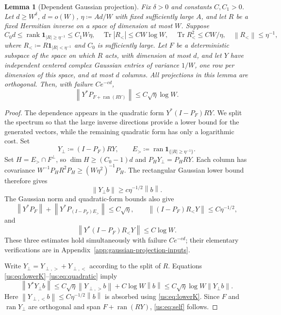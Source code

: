 \documentclass[11pt]{article}
\numberwithin{equation}{section}
\newtheorem{lemma}[theorem]{Lemma}
\theoremstyle{remark}
\newcommand{\Tr}{\operatorname{Tr}}
\newcommand{\rank}{\operatorname{rank}}
\newcommand{\ran}{\operatorname{ran}}
\newcommand{\one}{\mathbf 1}
\newcommand{\norm}[1]{\left\|#1\right\|}
\begin{document}
\begin{lemma}[Dependent Gaussian projection]\label{us:lem:self}
Fix $\delta>0$ and constants $C,C_1>0$. Let $d\ge W^\delta$, $d=o(W)$, $\eta\coloneqq Ad/W$ with fixed sufficiently
large $A$, and let $R$ be a fixed Hermitian inverse on a space of dimension
at most $W$. Suppose
\begin{equation}
 C_0d\le\rank\one_{|R|\ge\eta^{-1}}\le C_1W\eta,\quad
 \Tr|R_<|\le CW\log W,\quad
 \Tr R_<^2\le CW/\eta,\quad \norm{R_<}\le\eta^{-1},
 \label{us:eq:spectrum}
\end{equation}
where $R_<\coloneqq R\one_{|R|<\eta^{-1}}$ and $C_0$ is sufficiently large.
Let $F$ be a deterministic subspace of the space on which $R$ acts,
with dimension at most $d$, and let $Y$ have independent centered complex
Gaussian entries of variance $1/W$, one row per dimension of this space,
and at most $d$ columns. All projections in this lemma are orthogonal.
Then, with failure $Ce^{-cd}$,
\begin{equation}
 \norm{Y^*P_{F+\ran(RY)}}\le C\sqrt\eta\log W.
 \label{us:eq:self}
\end{equation}
\end{lemma}
\begin{proof}
The dependence appears in the quadratic form $Y^*(I-P_F)RY$. We split the
spectrum so that the large inverse directions provide a lower bound
for the generated vectors, while the remaining quadratic form has only
a logarithmic cost. Set
\[
 Y_\perp\coloneqq(I-P_F)RY,\qquad
 E_>\coloneqq\ran\one_{\{|R|\ge\eta^{-1}\}}.
\]
Set $H=E_>\cap F^\perp$, so $\dim H\ge(C_0-1)d$ and
$P_HY_\perp=P_HRY$. Each column has covariance
$W^{-1}P_HR^2P_H\ge(W\eta^2)^{-1}P_H$.
The rectangular Gaussian lower bound therefore gives
\begin{equation}\label{us:eq:lowerK}
 \norm{Y_\perp b}\ge c\eta^{-1/2}\norm b.
\end{equation}
The Gaussian norm and quadratic-form bounds also give
\begin{equation}\label{us:eq:Gaussnorm}
 \norm{Y^*P_F}+\norm{Y^*P_{(I-P_F)E_>}}\le C\sqrt\eta,
 \qquad \norm{(I-P_F)R_<Y}\le C\eta^{-1/2},
\end{equation}
and
\begin{equation}\label{us:eq:quadratic}
 \norm{Y^*(I-P_F)R_<Y}\le C\log W.
\end{equation}
These three estimates hold simultaneously with failure $Ce^{-cd}$;
their elementary verifications are in
Appendix~\ref{app:gaussian-projection-inputs}.

Write $Y_\perp=Y_{\perp,>}+Y_{\perp,<}$ according to the split of $R$. Equations
\eqref{us:eq:lowerK}--\eqref{us:eq:quadratic} imply
\[
 \norm{Y^*Y_\perp b}
 \le C\sqrt\eta\norm{Y_{\perp,>}b}+C\log W\norm b
 \le C\sqrt\eta\log W\norm{Y_\perp b}.
\]
Here $\norm{Y_{\perp,<}b}\le C\eta^{-1/2}\norm b$ is absorbed using
\eqref{us:eq:lowerK}. Since $F$ and $\ran Y_\perp$ are orthogonal and span
$F+\ran(RY)$, \eqref{us:eq:self} follows.
\end{proof}
\end{document}
